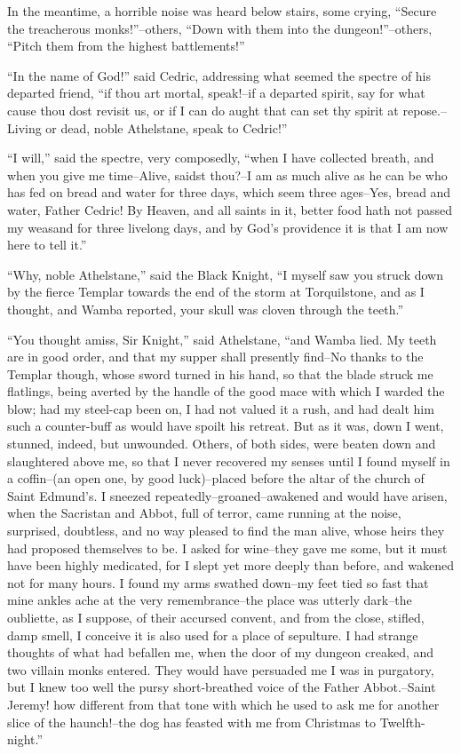 In the meantime, a horrible noise was heard below stairs, some crying,
``Secure the treacherous monks!''--others, ``Down with them into the
dungeon!''--others, ``Pitch them from the highest battlements!''

``In the name of God!'' said Cedric, addressing what seemed the spectre
of his departed friend, ``if thou art mortal, speak!--if a departed
spirit, say for what cause thou dost revisit us, or if I can do aught
that can set thy spirit at repose.--Living or dead, noble Athelstane,
speak to Cedric!''

``I will,'' said the spectre, very composedly, ``when I have collected
breath, and when you give me time--Alive, saidst thou?--I am as much
alive as he can be who has fed on bread and water for three days, which
seem three ages--Yes, bread and water, Father Cedric! By Heaven, and all
saints in it, better food hath not passed my weasand for three livelong
days, and by God's providence it is that I am now here to tell it.''

``Why, noble Athelstane,'' said the Black Knight, ``I myself saw you
struck down by the fierce Templar towards the end of the storm at
Torquilstone, and as I thought, and Wamba reported, your skull was
cloven through the teeth.''

``You thought amiss, Sir Knight,'' said Athelstane, ``and Wamba lied. My
teeth are in good order, and that my supper shall presently find--No
thanks to the Templar though, whose sword turned in his hand, so that
the blade struck me flatlings, being averted by the handle of the good
mace with which I warded the blow; had my steel-cap been on, I had not
valued it a rush, and had dealt him such a counter-buff as would have
spoilt his retreat. But as it was, down I went, stunned, indeed, but
unwounded. Others, of both sides, were beaten down and slaughtered above
me, so that I never recovered my senses until I found myself in a
coffin--(an open one, by good luck)--placed before the altar of the
church of Saint Edmund's. I sneezed repeatedly--groaned--awakened and
would have arisen, when the Sacristan and Abbot, full of terror, came
running at the noise, surprised, doubtless, and no way pleased to find
the man alive, whose heirs they had proposed themselves to be. I asked
for wine--they gave me some, but it must have been highly medicated, for
I slept yet more deeply than before, and wakened not for many hours. I
found my arms swathed down--my feet tied so fast that mine ankles ache
at the very remembrance--the place was utterly dark--the oubliette, as I
suppose, of their accursed convent, and from the close, stifled, damp
smell, I conceive it is also used for a place of sepulture. I had
strange thoughts of what had befallen me, when the door of my dungeon
creaked, and two villain monks entered. They would have persuaded me I
was in purgatory, but I knew too well the pursy short-breathed voice of
the Father Abbot.--Saint Jeremy! how different from that tone with which
he used to ask me for another slice of the haunch!--the dog has feasted
with me from Christmas to Twelfth-night.''

